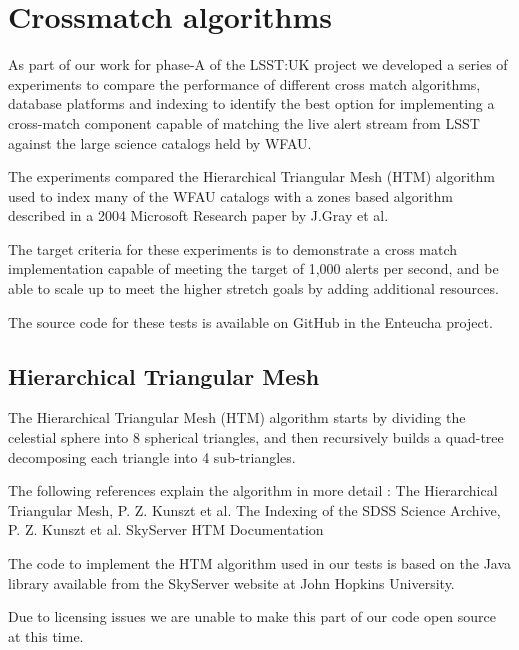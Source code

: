 \documentclass{article}
\newcommand{\enteucha} {Enteucha\xspace}
\newcommand{\github} {GitHub\xspace}
\newcommand{\phasea} {phase-A\xspace}
\newcommand{\lsst} {LSST\xspace}
\newcommand{\lsstuk} {LSST:UK\xspace}
\newcommand{\wfau} {WFAU\xspace}
\begin{document}
\section{Crossmatch algorithms}
\label{crossmatch-algorithms}

As part of our work for \phasea of the \lsstuk project we developed a series of experiments to compare the performance of different cross match algorithms, database platforms and indexing to identify the best option for implementing a cross-match component capable of matching the live alert stream from \lsst against the large science catalogs held by \wfau.

The experiments compared the Hierarchical Triangular Mesh (HTM) algorithm used to index many of the \wfau catalogs with a zones based algorithm described in a 2004 Microsoft Research paper by J.Gray et al. 

The target criteria for these experiments is to demonstrate a cross match implementation capable of meeting the target of 1,000 alerts per second, and be able to scale up to meet the higher stretch goals by adding additional resources.

The source code for these tests is available on \github in the \enteucha project.

\subsection{Hierarchical Triangular Mesh}
\label{crossmatch.htm}

The Hierarchical Triangular Mesh (HTM) algorithm starts by dividing the celestial sphere into 8 spherical triangles, and then recursively builds a quad-tree decomposing each triangle into 4 sub-triangles.

The following references explain the algorithm in more detail :
The Hierarchical Triangular Mesh, P. Z. Kunszt et al.
The Indexing of the SDSS Science Archive, P. Z. Kunszt et al.
SkyServer HTM Documentation

The code to implement the HTM algorithm used in our tests is based on the Java library available from the SkyServer website at John Hopkins University.

Due to licensing issues we are unable to make this part of our code open source at this time.
\end{document}
